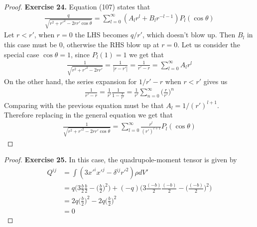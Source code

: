 \documentclass[11pt]{article}
\theoremstyle{definition}
\begin{document}
\cleardoublepage
\begin{proof}{\textbf{Exercise 24.}}
Equation (107) states that
\begin{align*}
    \frac{q}{\sqrt{r^2 + r'^2 -2rr'\cos\theta}}
    = \sum_{l=0}^\infty (A_lr^l + B_lr^{-l-1})P_l(\cos\theta)
\end{align*}
Let $r < r'$, when $r = 0$ the LHS becomes $q/r'$, which doesn't blow up. Then
$B_l$ in this case must be 0, otherwise the RHS blow up at $r=0$. Let us consider
the special case $\cos\theta = 1$, since $P_l(1) = 1$ we get that
\begin{align*}
    \frac{1}{\sqrt{r^2 + r'^2 -2rr'}} = 
    \frac{1}{|r - r'|} =
    \frac{1}{r' - r} = \sum_{l=0}^\infty A_lr^l
\end{align*}
On the other hand, the series expansion for $1/r' - r$ when $r < r'$ gives us
\begin{align*}
    \frac{1}{r' - r} = \frac{1}{r'}\frac{1}{1 - \frac{r}{r'}}
    = \frac{1}{r'}\sum_{n = 0}^\infty \bigg(\frac{r}{r'}\bigg)^n
\end{align*}
Comparing with the previous equation must be that $A_l = 1/(r')^{l+1}$.
\\
Therefore replacing in the general equation we get that
\begin{align*}
    \frac{1}{\sqrt{r^2 + r'^2 -2rr'\cos\theta}}
    = \sum_{l=0}^\infty \frac{r^l}{(r')^{l+1}}P_l(\cos\theta) 
\end{align*}
\end{proof}

\cleardoublepage
\begin{proof}{\textbf{Exercise 25.}}
In this case, the quadrupole-moment tensor is given by
\begin{align*}
    Q^{ij} &= \int(3x'^ix'^j - \delta^{ij}r'^2)\rho dV'\\
    &= q\bigg(3\frac{b}{2}\frac{b}{2} - \bigg(\frac{b}{2}\bigg)^2\bigg)
    + (-q)\bigg(3\frac{(-b)}{2}\frac{(-b)}{2} - \bigg(\frac{(-b)}{2}\bigg)^2\bigg)\\
    &= 2q\bigg(\frac{b}{2}\bigg)^2 - 2q\bigg(\frac{b}{2}\bigg)^2\\
    &= 0
\end{align*}
\end{proof}
\end{document}
